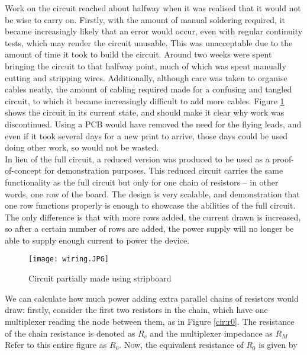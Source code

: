 Work on the circuit reached about halfway when it was realised that it would not be wise to carry on. Firstly, with the amount of manual soldering required, it became increasingly likely that an error would occur, even with regular continuity tests, which may render the circuit unusable. This was unacceptable due to the amount of time it took to build the circuit. Around two weeks were spent bringing the circuit to that halfway point, much of which was spent manually cutting and stripping wires. Additionally, although care was taken to organise cables neatly, the amount of cabling required made for a confusing and tangled circuit, to which it became increasingly difficult to add more cables. Figure \ref{fig:wiring} shows the circuit in its current state, and should make it clear why work was discontinued. Using a PCB would have removed the need for the flying leads, and even if it took several days for a new print to arrive, those days could be used doing other work, so would not be wasted.\\

In lieu of the full circuit, a reduced version was produced to be used as a proof-of-concept for demonstration purposes. This reduced circuit carries the same functionality as the full circuit but only for one chain of resistors -- in other words, one row of the board. The design is very scalable, and demonstration that one row functions properly is enough to showcase the abilities of the full circuit. The only difference is that with more rows added, the current drawn is increased, so after a certain number of rows are added, the power supply will no longer be able to supply enough current to power the device.

\begin{figure}[H]
	\begin{center}
	\texttt{[image: wiring.JPG]}\\ 
  	\caption{Circuit partially made using stripboard}
    \label{fig:wiring}
    \end{center}
\end{figure}

We can calculate how much power adding extra parallel chains of resistors would draw: firstly, consider the first two resistors in the chain, which have one multiplexer reading the node between them, as in Figure \ref{cir:r0}. The resistance of the chain resistance is denoted as  $R_c$ and the multiplexer impedance as $R_M$ Refer to this entire figure as $R_0$. Now, the equivalent resistance of $R_0$ is given by 


